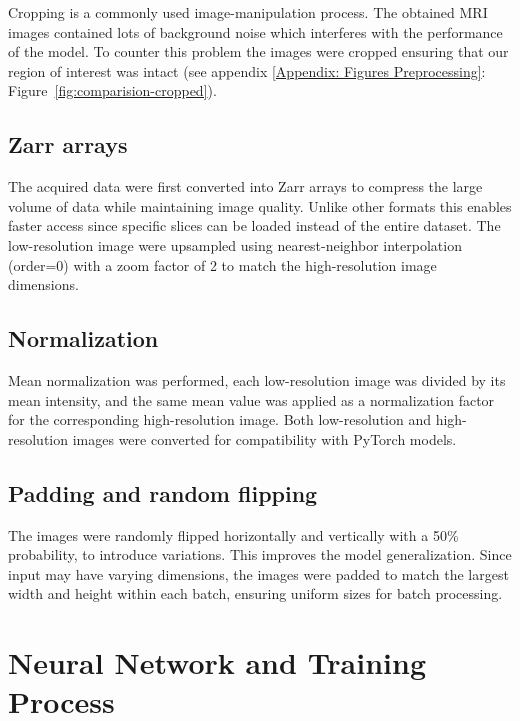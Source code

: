 \documentclass[twocolumn]{article}
\begin{document}
Cropping is a commonly used image-manipulation process. The obtained MRI images contained lots of background noise which interferes with the performance of the model. 
To counter this problem the images were cropped ensuring that our region of interest was intact (see appendix \ref{Appendix: Figures Preprocessing}: Figure~\ref{fig:comparision-cropped}).  

\subsection{Zarr arrays}

The acquired data were first converted into Zarr arrays to compress the large volume of data while maintaining image quality. 
Unlike other formats this enables faster access since specific slices can be loaded instead of the entire dataset.
The low-resolution image were upsampled using nearest-neighbor interpolation (order=0) with a zoom factor of 2 to match the high-resolution image dimensions. 

\subsection{Normalization}

Mean normalization was performed, each low-resolution image was divided by its mean intensity, and the same mean value was applied as a normalization factor for the corresponding high-resolution image.  
Both low-resolution and high-resolution images were converted for compatibility with PyTorch models.

\subsection{Padding and random flipping}
The images were randomly flipped horizontally and vertically with a 50\% probability, to introduce variations. 
This improves the model generalization. Since input may have varying dimensions, the images were padded to match the largest width and height within each batch, ensuring uniform sizes for batch processing.


\section{Neural Network and Training Process}
\end{document}
